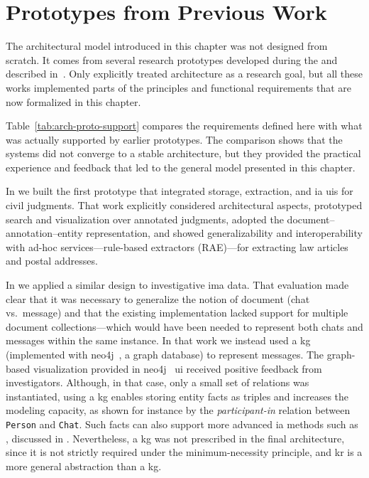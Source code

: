 \section{Prototypes from Previous Work}
\label{sec:arch_proto}
The architectural model introduced in this chapter was not designed from scratch. It comes from several research prototypes developed during the \phd and described in~\cite{BELLANDI2024,pozzi_wise_2025,Agazzi2025DAVE}. Only \textcite{BELLANDI2024} explicitly treated architecture as a research goal, but all these works implemented parts of the principles and functional requirements that are now formalized in this chapter.

Table~\ref{tab:arch-proto-support} compares the requirements defined here with what was actually supported by earlier prototypes. The comparison shows that the systems did not converge to a stable architecture, but they provided the practical experience and feedback that led to the general model presented in this chapter.

In \textcite{BELLANDI2024} we built the first prototype that integrated storage, extraction, and \ac{ia} \acsp{ui} for civil judgments. That work explicitly considered architectural aspects, prototyped search and visualization over annotated judgments, adopted the document--annotation--entity representation, and showed generalizability and interoperability with ad-hoc services---\ie rule-based extractors (RAE)---for extracting law articles and postal addresses.

In \textcite{pozzi_wise_2025} we applied a similar design to investigative \ac{ima} data. That evaluation made clear that it was necessary to generalize the notion of document (chat vs.\ message) and that the existing implementation lacked support for multiple document collections---which would have been needed to represent both chats and messages within the same instance. In that work we instead used a \acl{kg} (implemented with neo4j~\cite{neo4j}, a graph database) to represent messages. The graph-based visualization provided in neo4j~\cite{neo4j} \ac{ui} received positive feedback from investigators. Although, in that case, only a small set of relations was instantiated, using a \ac{kg} enables storing entity facts as triples and increases the modeling capacity, as shown for instance by the \textit{participant-in} relation between \texttt{Person} and \texttt{Chat}. Such facts can also support more advanced \ac{ia} methods such as , discussed in . Nevertheless, a \ac{kg} was not prescribed in the final architecture, since it is not strictly required under the minimum-necessity principle, and \ac{kr} is a more general abstraction than a \ac{kg}.

